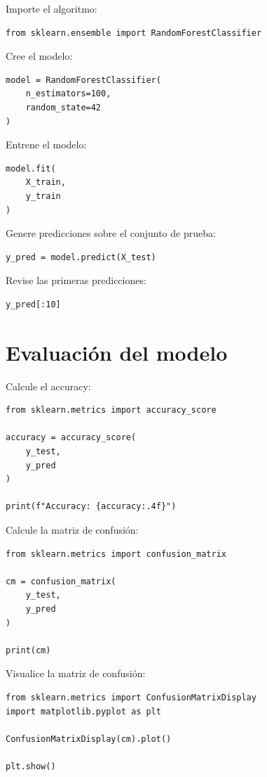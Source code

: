 \documentclass[
  coursetitle={Cómputo Nube y Tecnologías Emergentes},
  coursehours={96},
  coursedate={Verano 2026},
  doctype={Tutorial},
  otherlangs={english,french},
  authorname={Lázaro},
  authorsurname={Bustio-Martínez},
  authortitle={PhD},
  role={Profesor Investigador},
  email={lbustio@inaoe.mx},
  phone={5559504000},
  ext={7459},
  institution={Instituto Nacional de Astrofísica, Óptica y Electrónica (INAOE)},
  department={Maestría en Ciencias en Tecnologías de Seguridad},
  address={Luis Enrique Erro 1, Sta. Ma. Tonantzintla, San Andrés Cholula, CP 72840, Puebla, México},
  margin={0.5in}
]{../../lbustio_lecture_notes}
\begin{document}
Importe el algoritmo:

\begin{lstlisting}
from sklearn.ensemble import RandomForestClassifier
\end{lstlisting}

Cree el modelo:

\begin{lstlisting}
model = RandomForestClassifier(
    n_estimators=100,
    random_state=42
)
\end{lstlisting}

Entrene el modelo:

\begin{lstlisting}
model.fit(
    X_train,
    y_train
)
\end{lstlisting}

Genere predicciones sobre el conjunto de prueba:

\begin{lstlisting}
y_pred = model.predict(X_test)
\end{lstlisting}

Revise las primeras predicciones:

\begin{lstlisting}
y_pred[:10]
\end{lstlisting}

\section{Evaluación del modelo}

Calcule el accuracy:

\begin{lstlisting}
from sklearn.metrics import accuracy_score

accuracy = accuracy_score(
    y_test,
    y_pred
)

print(f"Accuracy: {accuracy:.4f}")
\end{lstlisting}

Calcule la matriz de confusión:

\begin{lstlisting}
from sklearn.metrics import confusion_matrix

cm = confusion_matrix(
    y_test,
    y_pred
)

print(cm)
\end{lstlisting}

Visualice la matriz de confusión:

\begin{lstlisting}
from sklearn.metrics import ConfusionMatrixDisplay
import matplotlib.pyplot as plt

ConfusionMatrixDisplay(cm).plot()

plt.show()
\end{lstlisting}
\end{document}
